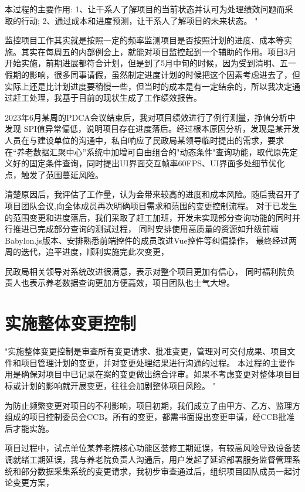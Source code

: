 \documentclass[UTF8]{../computerUniverse}
\begin{document}
本过程的主要作用:
1、让干系人了解项目的当前状态并认可为处理绩效问题而采取的行动;
2、通过成本和进度预测，让干系人了解项目的未来状态。
"

监控项目工作其实就是按照一定的频率监测项目是否按照计划的进度、成本等实施。其实在每周五的内部例会上，就能对项目监控起到一个辅助的作用。项目3月开始实施，前期进展都符合计划，但是到了5月中旬的时候，因为受到清明、五一假期的影响，很多同事请假，虽然制定进度计划的时候把这个因素考虑进去了，但实际上还是比计划进度要稍慢一些，但当时的成本是有一定结余的，所以我决定通过赶工处理，我基于目前的现状生成了工作绩效报告。

2023年6月某周的PDCA会议结束后，我对项目绩效进行了例行测量，挣值分析中发现 SPI值异常偏低，说明项目存在进度落后。经过根本原因分析，发现是某开发人员在与建设单位的沟通中，私自响应了民政局某领导临时提出的需求，要求在“养老数据汇聚中心”系统中加增可自由组合的"动态条件"查询功能，取代原先定义好的固定条件查询，同时提出UI界面交互帧率60FPS、UI界面多处细节优化点，触发了范围蔓延风险。

清楚原因后，我评估了工作量，认为会带来较高的进度和成本风险。随后我召开了项目团队会议,向全体成员再次明确项目需求和范围的变更控制流程。
对于已发生的范围变更和进度落后，我们采取了赶工加班，开发未实现部分查询功能的同时并行推进已完成部分查询的测试过程，
同时安排使用高质量的资源如升级前端Babylon.js版本、安排熟悉前端控件的成员改进Vue控件等纠偏操作，
最终经过两周的迭代，追平进度，顺利实施完此次变更，

民政局相关领导对系统改进很满意，表示对整个项目更加有信心，
同时福利院负责人也表示养老数据查询更加方便高效，项目团队也士气大增。



\section{实施整体变更控制}
"实施整体变更控制是审查所有变更请求、批准变更，管理对可交付成果、项目文件和项目管理计划的变更，并对变更处理结果进行沟通的过程。
本过程的主要作用是确保对项目中已记录在案的变更做出综合评审。如果不考虑变更对整体项目目标或计划的影响就开展变更，往往会加剧整体项目风险。
"

为防止频繁变更对项目的不利影响，项目初期，我们成立了由甲方、乙方、监理方组成的项目控制委员会CCB。所有的变更，都需书面提出变更申请，经CCB批准后才能实施。

项目过程中，试点单位某养老院核心功能区装修工期延误，有较高风险导致设备装调就绪工期延误，我与养老院负责人沟通后，用户发起了延迟部署服务监督管理系统和部分数据采集系统的变更请求，我初步审查通过后，组织项目团队成员一起讨论变更方案，
\end{document}
